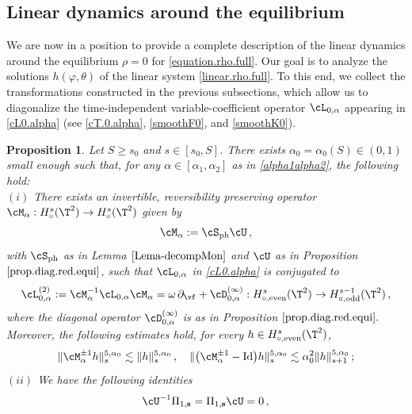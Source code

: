 \documentclass[a4paper,reqno,10pt]{article}
\newtheorem{pro}{Proposition}[section]
\newcommand{\pa}{\partial}
\begin{document}
\subsection{Linear dynamics around the equilibrium}

We are now in a position to provide a complete description of the linear dynamics around the equilibrium $\rho = 0$ for \eqref{equation.rho.full}. Our goal is to analyze the solutions $h(\varphi,\theta)$ of the linear system \eqref{linear.rho.full}. To this end, we collect the transformations constructed in the previous subsections, which allow us to diagonalize the time-independent variable-coefficient operator $\cL_{0,\alpha}$ appearing in \eqref{cL0.alpha} (see \eqref{cT.0.alpha}, \eqref{smoothF0}, and \eqref{smoothK0}).


\begin{pro}\label{prop.Malpha}
	Let $   S\geq s_0$ and $s\in [s_0,S]$. There exists $\alpha_{0}=\alpha_{0}(S)\in (0,1)$ small enough such that, for any $\alpha\in [\alpha_{1},\alpha_{2}]$ as in \eqref{alpha1alpha2}, the following hold:
	\\[1mm]
	\noindent $(i)$ There exists an invertible, reversibility preserving operator $\cM_{\alpha}:H_{\circ}^{s}(\T^2)\to H_{\circ}^{s}(\T^2)$  given by
	\begin{equation}\label{Malpha}
		\cM_{\alpha} := \cS_{\rm ph} \cU \,,
	\end{equation}
	with $\cS_{\rm ph}$ as in Lemma $\ref{Lema-decompMon}$ and $\cU$ as in Proposition $\ref{prop.diag.red.equi}$, such that $\cL_{0,\alpha}$ in \eqref{cL0.alpha} is conjugated to
	\begin{equation}
		\cL_{0,\alpha}^{(2)} := \cM_{\alpha}^{-1} \cL_{0,\alpha} \cM_{\alpha} = \omega\,\pa_{\vf} + \cD_{0,\alpha}^{(\infty)} : H_{\circ,{\rm even}}^{s}(\T^2) \to H_{\circ,{\rm odd}}^{s-1} (\T^2)\,,
	\end{equation}
	where the diagonal operator $\cD_{0,\alpha}^{(\infty)}$ is as in Proposition $\ref{prop.diag.red.equi}.$ Moreover, the following estimates hold, for every $h\in H_{\circ,{\rm even}}^{s}(\T^2)$,
	\begin{equation}
		\| \cM_{\alpha}^{\pm 1} h \|_{s}^{5,\alpha_{0}} \lesssim \| h\|_{s}^{5,\alpha_{0}} \,, \quad \| \big(\cM_{\alpha}^{\pm 1} -{\rm Id}\big)h \|_{s}^{5,\alpha_{0}} \lesssim \alpha_{0}^2 \| h\|_{s+1}^{5,\alpha_{0}} \,;
	\end{equation}
    \noindent $(ii)$ We have the following identities
    \begin{align}
       &  \cU^{-1}\Pi_{1,{\bf s}} = \Pi_{1,{\bf s}} \cU = 0 \,, \\

\end{align}
\end{pro}
\end{document}
